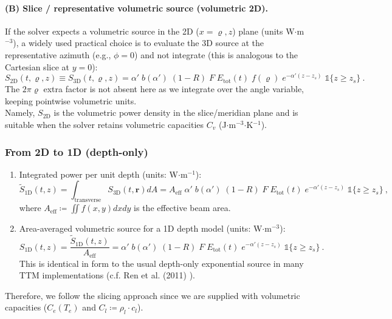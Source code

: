 \paragraph{(B) Slice / representative volumetric source (volumetric 2D).}
If the solver expects a volumetric source in the 2D ($x=\varrho,z$) plane (units W$\cdot$m$^{-3}$),
a widely used practical choice is to evaluate the 3D source at the representative azimuth (e.g., $\phi=0$)
and not integrate (this is analogous to the Cartesian slice at $y=0$):
\begin{equation}
  S_\text{2D}(t,\varrho,z) \equiv S_\text{3D}(t,\varrho,z) = \alpha' \; b(\alpha') \; (1-R) \; F \; E_\text{tot}(t) \; f(\varrho) \; e^{-\alpha'(z-z_s)} \; \mathds{1}\{z \geq z_s\} \ .
\end{equation}
The $2\pi\varrho$ extra factor is not absent here as we integrate over the angle variable, keeping pointwise volumetric units.\\
Namely, $S_\text{2D}$ is the volumetric power density in the slice/meridian plane and is suitable when the solver retains volumetric capacities $C_v$ (J$\cdot$m$^{-3}$$\cdot$K$^{-1}$).

  \subsubsection{From 2D to 1D (depth-only)}

  \begin{enumerate}
    \item Integrated power per unit depth (units: W$\cdot$m$^{-1}$):
          \begin{equation}
            \widetilde{S}_\text{1D}(t,z) = \int_\text{transverse} S_\text{3D} (t, \mathbf{r}) dA =  A_\text{eff}\;\alpha'\;b(\alpha')\;(1-R)\;F\;E_\text{tot}(t)\;e^{-\alpha'(z-z_s)} \; \mathds{1}\{z \geq z_s\} \ ,
          \end{equation}
          where $A_\text{eff} \coloneqq \iint f(x,y)dxdy$ is the effective beam area.
    \item Area-averaged volumetric source for a 1D depth model (units: W$\cdot$m$^{-3}$):
          \begin{equation}
            S_\text{1D}(t,z) = \frac{\widetilde{S}_\text{1D}(t,z)}{A_\text{eff}} = \alpha'\;b(\alpha')\;(1-R)\;F\;E_\text{tot}(t)\;e^{-\alpha'(z-z_s)} \; \mathds{1}\{z \geq z_s\} \ .
          \end{equation}
          This is identical in form to the usual depth-only exponential source in many TTM implementations (c.f. Ren et al. (2011) \cite{Ren_2011}).
  \end{enumerate}
  Therefore, we follow the slicing approach since we are supplied with volumetric capacities ($C_e(T_e)$ and $C_l \coloneqq \rho_l \cdot c_l$).

